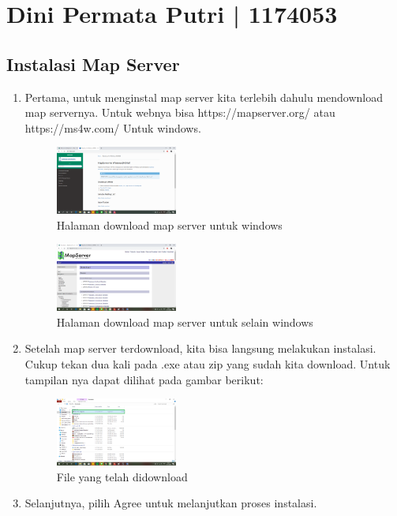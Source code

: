 \section{Dini Permata Putri | 1174053}
\subsection{Instalasi Map Server}
\begin{enumerate}
	\item Pertama, untuk menginstal map server kita terlebih dahulu mendownload map servernya. Untuk webnya bisa https://mapserver.org/ atau https://ms4w.com/ Untuk windows.
    \hfill\break
    \begin{figure}[H]
		\includegraphics[width=4cm]{figures/tugas4/1174053/1.png}
		\centering
		\caption{Halaman download map server untuk windows}
    \end{figure}
    \hfill\break
    \begin{figure}[H]
		\includegraphics[width=4cm]{figures/tugas4/1174053/2.png}
		\centering
		\caption{Halaman download map server untuk selain windows}
    \end{figure}
    \item Setelah map server terdownload, kita bisa langsung melakukan instalasi. Cukup tekan dua kali pada .exe atau zip yang sudah kita download. Untuk tampilan nya dapat dilihat pada gambar berikut:
    \hfill\break
    \begin{figure}[H]
		\includegraphics[width=4cm]{figures/tugas4/1174053/3.png}
		\centering
		\caption{File yang telah didownload}
    \end{figure}
    \hfill\break
    \item Selanjutnya, pilih Agree untuk melanjutkan proses instalasi. 

\end{enumerate}
